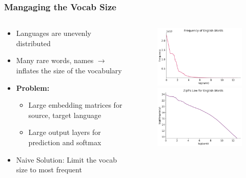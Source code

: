 \documentclass[usenames,dvipsnames]{beamer}
\begin{document}
\begin{frame}
\frametitle{Mangaging the Vocab Size}
\begin{columns}
  \begin{column}{0.45\textwidth}
    \begin{itemize}
      \item Languages are unevenly distributed
      \item Many rare words, names $\rightarrow$ inflates the size of the vocabulary
      \item \textbf{Problem:}
      \begin{itemize}
        \item Large embedding matrices for source, target language
        \item Large output layers for prediction and softmax
      \end{itemize}
      \item Naive Solution: Limit the vocab size to most frequent
    \end{itemize}
  \end{column}
  \begin{column}{0.45\textwidth}
    \begin{figure}
      \centering
      \includegraphics[width=4.5cm, valign=c]{assets/zipf}
      \vspace{5mm}
      \includegraphics[width=4.5cm, valign=c]{assets/zipf_log}
    \end{figure}
  \end{column}
\end{columns}
\end{frame}
\end{document}
